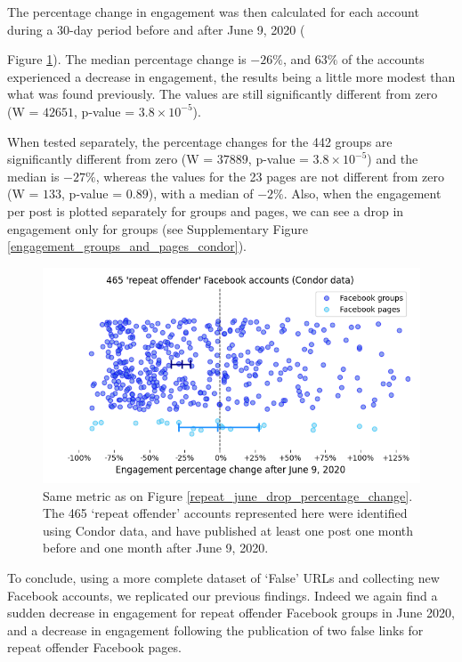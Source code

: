 \documentclass[review]{elsarticle}
\begin{document}
The percentage change in engagement was then calculated for each account during a 30-day period before and after June 9, 2020 ({Figure \ref{condor_june_drop_percentage_change}).
The median percentage change is $-26\%$, and $63\%$ of the accounts experienced a decrease in engagement, the results being a little more modest than what was found previously.
The values are still significantly different from zero (W = $42651$, p-value = $3.8 \times 10^{-5}$).

When tested separately, the percentage changes for the 442 groups are significantly different from zero (W = $37889$, p-value = $3.8 \times 10^{-5}$) and the median is $-27\%$, whereas the values for the 23 pages are not different from zero (W = $133$, p-value = $0.89$), with a median of $-2\%$.
Also, when the engagement per post is plotted separately for groups and pages, we can see a drop in engagement only for groups (see Supplementary Figure \ref{engagement_groups_and_pages_condor}).

\begin{figure}[!h]
\centering
\includegraphics[scale=0.5]{./../figure/condor_june_drop_percentage_change.png}
\caption{
Same metric as on Figure \ref{repeat_june_drop_percentage_change}.
The 465 `repeat offender' accounts represented here were identified using Condor data, and have published at least one post one month before and one month after June 9, 2020.
}
\label{condor_june_drop_percentage_change}
\end{figure}

To conclude, using a more complete dataset of `False' URLs and collecting new Facebook accounts, we replicated our previous findings. 
Indeed we again find a sudden decrease in engagement for repeat offender Facebook groups in June 2020, and a decrease in engagement following the publication of two false links for repeat offender Facebook pages.

}
\end{document}

